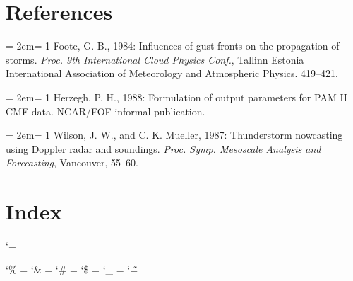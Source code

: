 \part{References}

\newcommand{\reference}{\hangindent = 2em\hangafter = 1}

\reference
Foote, G. B., 1984: Influences of gust fronts on the propagation of storms. 
{\sl Proc. 9th International Cloud Physics Conf.}, Tallinn Estonia 
International Association of Meteorology and Atmospheric Physics.  419--421.

\reference
Herzegh, P. H., 1988: Formulation of output parameters for PAM II CMF data.
NCAR/FOF informal publication.

\reference
Wilson, J. W., and C. K. Mueller, 1987: Thunderstorm nowcasting using Doppler
radar and soundings.  {\sl Proc. Symp. Mesoscale Analysis and Forecasting},
Vancouver, 55--60.

\part{Index}
{ %
\makeatletter
\gdef\thepage{Index--\the\c@page}

\catcode`\@=\other

\catcode`\% = \other	\catcode`\& = \other	\catcode`\# = \other
\catcode`\$ = \other	\catcode`\_ = \other	\catcode`\~ = \other


} %


